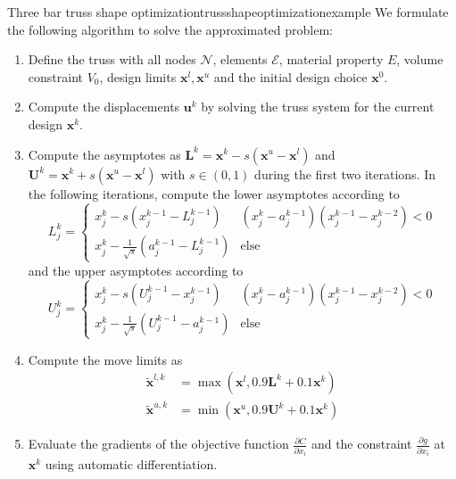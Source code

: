 \begin{example}{Three bar truss shape optimization}{trussshapeoptimizationexample}
    We formulate the following algorithm to solve the approximated problem: 
    \begin{enumerate}
        \item Define the truss with all nodes $\mathcal{N}$, elements $\mathcal{E}$, material property $E$, volume constraint $V_0$, design limits $\mathbf{x}^l, \mathbf{x}^u$ and the initial design choice $\mathbf{x}^0$.
        \item Compute the displacements $\mathbf{u}^k$ by solving the truss system for the current design $\mathbf{x}^k$.
        \item Compute the asymptotes as $\mathbf{L}^k =\mathbf{x}^k - s (\mathbf{x}^u - \mathbf{x}^l)$ and $\mathbf{U}^k =\mathbf{x}^k + s (\mathbf{x}^u - \mathbf{x}^l)$ with $s \in (0,1)$ during the first two iterations. In the following iterations, compute the lower asymptotes according to 
        \begin{equation}
            L^k_j = 
            \begin{cases}
                x^k_j - s  (x^{k-1}_j-L^{k-1}_j) & (x_j^k-a_j^{k-1})(x_j^{k-1}-x_j^{k-2}) < 0\\
                x^k_j - \frac{1}{\sqrt{s}}  (a^{k-1}_j-L^{k-1}_j) & \text{else}
            \end{cases}
        \end{equation}
        and the upper asymptotes according to 
        \begin{equation}
            U^k_j = 
            \begin{cases}
                x^k_j - s  (U^{k-1}_j-x^{k-1}_j) & (x_j^k-a_j^{k-1})(x_j^{k-1}-x_j^{k-2}) < 0\\
                x^k_j - \frac{1}{\sqrt{s}}  (U^{k-1}_j-a^{k-1}_j) & \text{else}
            \end{cases}
        \end{equation}

        \item Compute the move limits as 
        \begin{align}
            \tilde{\mathbf{x}}^{l,k} &= \max(\mathbf{x}^l,  0.9 \mathbf{L}^k + 0.1 \mathbf{x}^k) \\
            \tilde{\mathbf{x}}^{u,k} &= \min(\mathbf{x}^u,  0.9 \mathbf{U}^k + 0.1 \mathbf{x}^k)
        \end{align}

        \item Evaluate the gradients of the objective function $\frac{\partial C}{\partial x_i}$ and the constraint $\frac{\partial g}{\partial x_i}$ at $\mathbf{x}^k$ using automatic differentiation. 


\end{enumerate}
\end{example}
